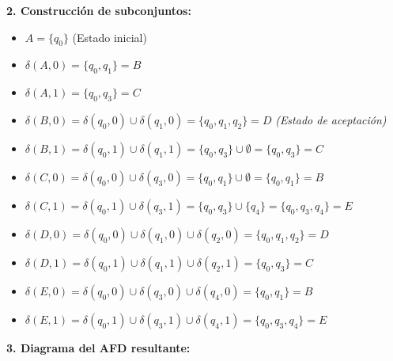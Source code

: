 \documentclass[12pt]{article}
\begin{document}
\begin{itemize}
    \textbf{2. Construcción de subconjuntos:}
    \begin{itemize}
        \item $A = \{q_0\}$ (Estado inicial)
        \item $\delta(A, 0) = \{q_0, q_1\} = B$
        \item $\delta(A, 1) = \{q_0, q_3\} = C$
        \item $\delta(B, 0) = \delta(q_0, 0) \cup \delta(q_1, 0) = \{q_0, q_1, q_2\} = D$ \textit{(Estado de aceptación)}
        \item $\delta(B, 1) = \delta(q_0, 1) \cup \delta(q_1, 1) = \{q_0, q_3\} \cup \emptyset = \{q_0, q_3\} = C$
        \item $\delta(C, 0) = \delta(q_0, 0) \cup \delta(q_3, 0) = \{q_0, q_1\} \cup \emptyset = \{q_0, q_1\} = B$
        \item $\delta(C, 1) = \delta(q_0, 1) \cup \delta(q_3, 1) = \{q_0, q_3\} \cup \{q_4\} = \{q_0, q_3, q_4\} = E$
        \item $\delta(D, 0) = \delta(q_0, 0) \cup \delta(q_1, 0) \cup \delta(q_2, 0) = \{q_0, q_1, q_2\} = D$
        \item $\delta(D, 1) = \delta(q_0, 1) \cup \delta(q_1, 1) \cup \delta(q_2, 1) = \{q_0, q_3\} = C$
        \item $\delta(E, 0) = \delta(q_0, 0) \cup \delta(q_3, 0) \cup \delta(q_4, 0) = \{q_0, q_1\} = B$
        \item $\delta(E, 1) = \delta(q_0, 1) \cup \delta(q_3, 1) \cup \delta(q_4, 1) = \{q_0, q_3, q_4\} = E$
    \end{itemize}

    \textbf{3. Diagrama del AFD resultante:}
    \begin{center}
    \end{center}


\end{itemize}
\end{document}
